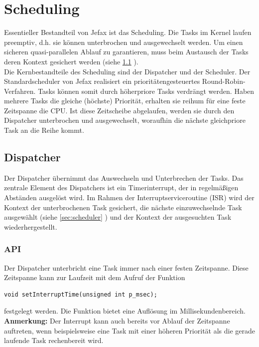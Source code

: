 \documentclass[fontsize=12pt, toc=bibliography, notitlepage]{scrreprt}
\newcommand{\refnn}[1]{\ref{#1} \nameref{#1}}
\begin{document}
\chapter{Scheduling}
\label{chap:scheduling}
Essentieller Bestandteil von Jefax ist das Scheduling. Die Tasks im Kernel laufen preemptiv, d.h. sie können unterbrochen und ausgewechselt werden. Um einen sicheren quasi-parallelen Ablauf zu garantieren, muss beim Austausch der Tasks deren Kontext gesichert werden (siehe \refnn{sec:dispatcher}).\\
Die Kernbestandteile des Scheduling sind der Dispatcher und der Scheduler. Der Standardscheduler von Jefax realisiert ein prioritätengesteuertes Round-Robin-Verfahren. Tasks können somit durch höherpriore Tasks verdrängt werden. Haben mehrere Tasks die gleiche (höchste) Priorität, erhalten sie reihum für eine feste Zeitspanne die CPU. Ist diese Zeitscheibe abgelaufen, werden sie durch den Dispatcher unterbrochen und ausgewechselt, woraufhin die nächste gleichpriore Task an die Reihe kommt.

\section{Dispatcher}
\label{sec:dispatcher}
Der Dispatcher übernimmt das Auswechseln und Unterbrechen der Tasks. Das zentrale Element des Dispatchers ist ein Timerinterrupt, der in regelmäßigen Abständen ausgelöst wird. Im Rahmen der Interruptserviceroutine (ISR) wird der Kontext der unterbrochenen Task gesichert, die nächste einzuwechselnde Task ausgewählt (siehe \refnn{sec:scheduler}) und der Kontext der ausgesuchten Task wiederhergestellt. 

\subsection{API}
\label{subsec:dispatcher-api}
Der Dispatcher unterbricht eine Task immer nach einer festen Zeitspanne. Diese Zeitspanne kann zur Laufzeit mit dem Aufruf der Funktion 

\begin{lstlisting}[title=dispatcher.h]
void setInterruptTime(unsigned int p_msec);
\end{lstlisting}

festgelegt werden. Die Funktion bietet eine Auflösung im Millisekundenbereich.\\
\textbf{Anmerkung:} Der Interrupt kann auch bereits vor Ablauf der Zeitspanne auftreten, wenn beispielsweise eine Task mit einer höheren Priorität als die gerade laufende Task rechenbereit wird.
\end{document}
